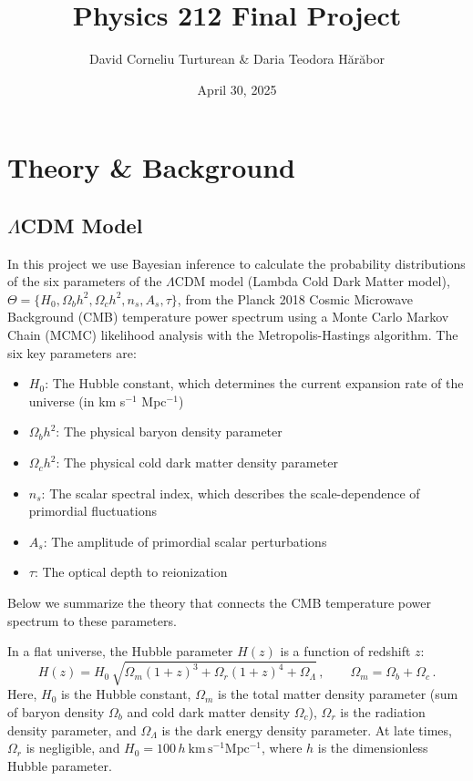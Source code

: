 \documentclass[11pt]{article}
\author{David Corneliu Turturean \& Daria Teodora Hărăbor}
\date{April 30, 2025}
\title{Physics 212 Final Project}
\theoremstyle{definition}
\begin{document}
\maketitle

\section{Theory \& Background}
\label{sec:theory}

\subsection{$\Lambda$CDM Model}
In this project we use Bayesian inference to calculate the probability distributions of the six parameters of the $\Lambda$CDM model (Lambda Cold Dark Matter model),
\(\Theta=\{H_0,\Omega_b h^2,\Omega_c h^2,n_s,A_s,\tau\}\), from the Planck 2018
Cosmic Microwave Background (CMB) temperature power spectrum using a Monte Carlo Markov Chain (MCMC) likelihood analysis with the Metropolis-Hastings algorithm. The six key parameters are:

\begin{itemize}
  \item $H_0$: The Hubble constant, which determines the current expansion rate of the universe (in km s$^{-1}$ Mpc$^{-1}$)
  \item $\Omega_b h^2$: The physical baryon density parameter
  \item $\Omega_c h^2$: The physical cold dark matter density parameter
  \item $n_s$: The scalar spectral index, which describes the scale-dependence of primordial fluctuations
  \item $A_s$: The amplitude of primordial scalar perturbations
  \item $\tau$: The optical depth to reionization
\end{itemize}

Below we summarize the theory that connects the CMB temperature power spectrum to these parameters.

In a flat universe, the Hubble parameter $H(z)$ is a function of redshift \(z\):
\begin{equation}
  H(z)
  = H_0\,\sqrt{\Omega_m(1+z)^3 + \Omega_r(1+z)^4 + \Omega_\Lambda}\,,
  \qquad
  \Omega_m = \Omega_b + \Omega_c\,.
\end{equation}
Here, $H_0$ is the Hubble constant, $\Omega_m$ is the total matter density parameter (sum of baryon density $\Omega_b$ and cold dark matter density $\Omega_c$), $\Omega_r$ is the radiation density parameter, and $\Omega_\Lambda$ is the dark energy density parameter. At late times, \(\Omega_r\) is negligible, and 
\(H_0 = 100\,h\ \mathrm{km\,s^{-1}Mpc^{-1}}\), where $h$ is the dimensionless Hubble parameter.
\end{document}
